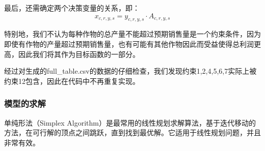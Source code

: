 \documentclass{cumcmthesis}
\begin{document}
最后，还需确定两个决策变量的关系，即：
\begin{equation}
    x_{c,r,y,s} = y_{c,r,y,s} \cdot A_{c,r,y,s}
\end{equation}



特别地，我们不认为每种作物的总产量不能超过预期销售量是一个约束条件，因为即使有作物的产量超过预期销售量，也有可能有其他作物因此而受益使得总利润更高，因此我们将其作为目标函数的一部分。

经过对生成的full\_table.csv的数据的仔细检查，我们发现约束1,2,4,5,6,7实际上被约束12包含，因此在代码中不再重复实现。


\subsubsection{模型的求解}
单纯形法（Simplex Algorithm）是最常用的线性规划求解算法，基于迭代移动的方法，在可行解的顶点之间跳跃，直到找到最优解。它适用于线性规划问题，并且非常有效。
\end{document}

